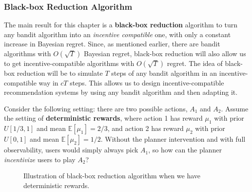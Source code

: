 \documentclass[
  letterpaper,
  numbers=noenddot,
  DIV=11,
  oneside]{scrreprt}
\theoremstyle{remark}
\begin{document}
\subsubsection*{Black-box Reduction
Algorithm}\label{black-box-reduction-algorithm}

The main result for this chapter is a \textbf{black-box reduction}
algorithm to turn any bandit algorithm into an \emph{incentive
compatible} one, with only a constant increase in Bayesian regret.
Since, as mentioned earlier, there are bandit algorithms with
\(O(\sqrt{T})\) Bayesian regret, black-box reduction will also allow us
to get incentive-compatible algorithms with \(O(\sqrt{T})\) regret. The
idea of black-box reduction will be to simulate \(T\) steps of any
bandit algorithm in an incentive-compatible way in \(c T\) steps. This
allows us to design incentive-compatible recommendation systems by using
any bandit algorithm and then adapting it.

Consider the following setting: there are two possible actions, \(A_1\)
and \(A_2\). Assume the setting of \textbf{deterministic rewards}, where
action 1 has reward \(\mu_1\) with prior \(U[1/3, 1]\) and mean
\(\mathbb{E}[\mu_1] = 2/3\), and action 2 has reward \(\mu_2\) with
prior \(U[0, 1]\) and mean \(\mathbb{E}[\mu_2] = 1/2\). Without the
planner intervention and with full observability, users would simply
always pick \(A_1\), so how can the planner \emph{incentivize} users to
play \(A_2\)?

\begin{figure}


\caption{\label{fig-deterministic-guinea-pig}Illustration of black-box
reduction algorithm when we have deterministic rewards.}

\end{figure}%
\end{document}
